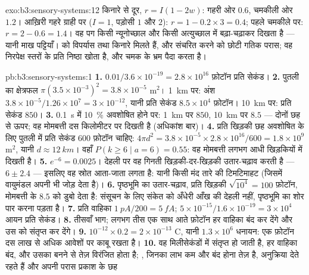 \begin{solution}{exo:b3:sensory-systems:12}
किनारे से दूर, $r = I(1 - 2w)$: गहरी ओर $0.6$, चमकीली ओर $1.2$।
आख़िरी गहरे ग्राही पर ($I = 1$, पड़ोसी $1$ और $2$): $r
= 1 - 0.2\times 3 = 0.4$; पहले चमकीले पर: $r = 2 - 0.6 = 1.4$।
वह पग किसी न्यूनोच्छाल और किसी अत्युच्छाल में बढ़ा-चढ़ाकर दिखता है ---
यानी माख पट्टियाँ।  को विपर्यास तथा किनारे मिलते हैं, और
संचरित करने को छोटी गतिक परास; वह निरपेक्ष स्तरों के प्रति निष्ठा खोता
है, और चमक के भ्रम पैदा करता है।
\end{solution}

\begin{solution}{pb:b3:sensory-systems:1}
\textbf{1.} $0.01/3.6\times 10^{-19} = 2.8\times 10^{16}$ फ़ोटॉन प्रति
सेकंड।
\textbf{2.} पुतली का क्षेत्रफल $\pi(3.5\times 10^{-3})^{2} = 3.8\times 10^{-5}$
m$^{2}$। \qty{1}{km} पर: अंश $3.8\times 10^{-5}/1.26\times 10^{7} =
3\times 10^{-12}$, यानी प्रति सेकंड $8.5\times 10^{4}$ फ़ोटॉन।
\qty{10}{km} पर: प्रति सेकंड $850$।
\textbf{3.} \qty{0.1}{s} में \qty{10}{\%} अवशोषित होने पर:
\qty{1}{km} पर $850$, \qty{10}{km} पर $8.5$ --- दोनों छह से ऊपर; वह
मोमबत्ती दस किलोमीटर पर दिखती है (अधिकांश बार)।
\textbf{4.} प्रति खिड़की छह अवशोषित के लिए पुतली में प्रति सेकंड $600$
फ़ोटॉन चाहिए: $4\pi d^{2} = 3.8\times 10^{-5}\times 2.8\times 10^{16}/600
= 1.8\times 10^{9}$ m$^{2}$, यानी $d \approx \qty{12}{km}$। वहाँ $P(k \ge
6 \mid a = 6) = 0.55$: वह मोमबत्ती लगभग आधी खिड़कियों में दिखती है।
\textbf{5.} $e^{-6} = 0.0025$। देहली पर वह गिनती खिड़की-दर-खिड़की
उतार-चढ़ाव करती है --- $6 \pm 2.4$ --- इसलिए वह स्रोत आता-जाता लगता है:
यानी किसी मंद तारे की टिमटिमाहट (जिसमें वायुमंडल अपनी भी जोड़ देता है)।
\textbf{6.} पृष्ठभूमि का उतार-चढ़ाव, प्रति खिड़की $\sqrt{10^{4}} = 100$
फ़ोटॉन, मोमबत्ती के $8.5$ को डुबो देता है: संसूचन के लिए संकेत को
अँधेरी आँख की देहली नहीं, पृष्ठभूमि का शोर पार करना पड़ता है।
\textbf{7.} प्रति वाहिका $\qty{1}{pA}/200 = \qty{5}{fA}$; $5\times
10^{-15}/1.6\times 10^{-19} = 3\times 10^{4}$ आयन प्रति सेकंड।
\textbf{8.} तीसवाँ भाग; लगभग तीस एक साथ आते फ़ोटॉन हर वाहिका बंद कर
देंगे और उस  को संतृप्त कर देंगे।
\textbf{9.} $10^{-12}\times 0.2 = 2\times 10^{-13}$ C, यानी $1.3\times 10^{6}$
धनायन: एक फ़ोटॉन दस लाख से अधिक आवेशों पर काबू रखता है।
\textbf{10.} वह  मिलीसेकंडों में संतृप्त हो जाती है, हर वाहिका बंद,
और उसका  बनने से तेज़ विरंजित होता है; , जिनका लाभ कम और
बंद होना तेज़ है, अनुक्रिया देते रहते हैं और अपनी परास प्रकाश के छह

\end{solution}
